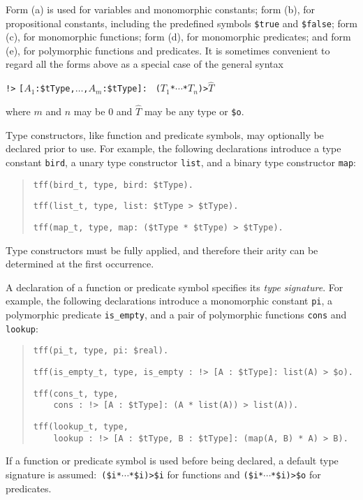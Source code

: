 Form (a) is used for variables and monomorphic constants; form (b), for
propositional constants, including the predefined symbols \verb+$true+ and
\verb+$false+; form (c), for monomorphic functions; form (d), for monomorphic
predicates; and form (e), for polymorphic functions and predicates.
It is sometimes convenient to regard all the forms above as a special case of
the general syntax
\begin{center}
{\tt !>} {\tt [$A_1$\;:\;\$tType,\;${\dots}$,\;$A_m$\;:\;\$tType]:} {\tt
($T_1$\;*\;${\cdots}$\;*\;$T_n$)\;>\;$\widehat T$}
\end{center}
where $m$ and $n$ may be 0 and $\widehat T$ may be any type or {\tt \$o}.


 Type constructors,
like function and predicate symbols,
may optionally be declared prior to use.
For example, the following declarations introduce a type
constant {\tt bird}, a unary type constructor {\tt list},
and a binary type constructor {\tt map}:
\begin{quote}
\verb+tff(bird_t, type, bird: $tType).+
\par\smallskip
\verb+tff(list_t, type, list: $tType > $tType).+
\par\smallskip
\verb+tff(map_t, type, map: ($tType * $tType) > $tType).+
\end{quote}
Type constructors must be fully applied, and therefore
their arity can be %
determined at the first occurrence.

A declaration of a function or predicate symbol specifies its {\em type
signature}. For example, the following declarations introduce a monomorphic
constant {\tt pi}, a polymorphic predicate
{\tt is\_empty}, and a pair of polymorphic functions {\tt cons} and {\tt lookup}:
\begin{quote}
\verb+tff(pi_t, type, pi: $real).+
\par\smallskip
\verb+tff(is_empty_t, type, is_empty : !> [A : $tType]: list(A) > $o).+\kern-10mm
\par\smallskip
\verb+tff(cons_t, type,+\\
\verb+    cons : !> [A : $tType]: (A * list(A)) > list(A)).+
\par\smallskip
\verb+tff(lookup_t, type,+\\
\verb+    lookup : !> [A : $tType, B : $tType]: (map(A, B) * A) > B).+
\end{quote}
If a function or predicate symbol is used before being declared, a
default type signature is assumed:\ {\tt (\$i\;*\;${\cdots}$\;*\;\$i)\;>\;\$i}
for functions and {\tt (\$i\;*\;${\cdots}$\;*\;\$i)\;>\;\$o} for predicates.

